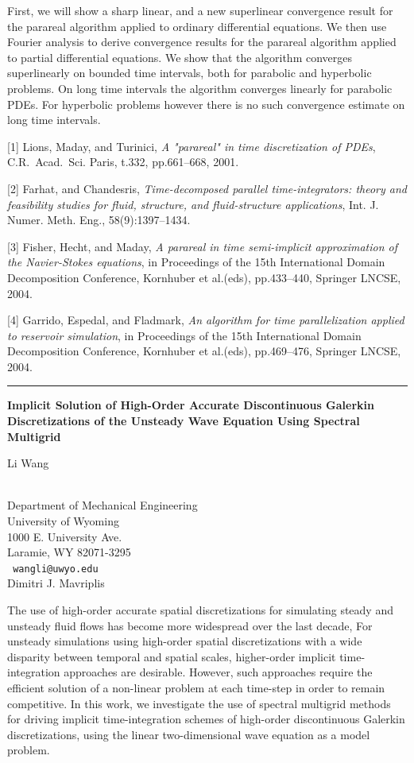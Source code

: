 \documentclass[twosided]{report}
\begin{document}
First, we will show a sharp linear, and a new superlinear convergence
result for the parareal algorithm applied to ordinary differential
equations. We then use Fourier analysis to derive convergence results
for the parareal algorithm applied to partial differential equations.
We show that the algorithm converges superlinearly on bounded time
intervals, both for parabolic and hyperbolic problems. On long time
intervals the algorithm converges linearly for parabolic PDEs. For
hyperbolic problems however there is no such convergence estimate on
long time intervals.

[1] Lions, Maday, and Turinici,
{\em A "parareal" in time discretization of
PDEs}, C.R.~Acad.~Sci. Paris, t.332, pp.661--668, 2001.

[2] Farhat, and Chandesris,
{\em Time-decomposed parallel time-integrators:
theory and feasibility studies for fluid, structure, and
fluid-structure applications}, Int. J. Numer. Meth. Eng.,
58(9):1397--1434.

[3] Fisher, Hecht, and Maday,
{\em A parareal in time semi-implicit
approximation of the Navier-Stokes equations}, in Proceedings of the
15th International Domain Decomposition Conference, Kornhuber et
al.(eds), pp.433--440, Springer LNCSE, 2004.

[4] Garrido, Espedal, and Fladmark,
{\em An algorithm for time
parallelization applied to reservoir simulation}, in Proceedings of the
15th International Domain Decomposition Conference, Kornhuber et
al.(eds), pp.469--476, Springer LNCSE, 2004.

\begin{center}

\rule{6in}{1pt}
\end{center}

\begin{center}
{\large			\label{wang}
{\bf
Implicit Solution of High-Order Accurate Discontinuous Galerkin
Discretizations of the Unsteady Wave Equation Using Spectral Multigrid
}

Li Wang} \\ 
Department of Mechanical Engineering \\
University of Wyoming \\
1000 E. University Ave. \\
Laramie, WY 82071-3295
\\ {\tt
wangli@uwyo.edu
}
\\
Dimitri J. Mavriplis
\end{center}

The use of high-order accurate spatial discretizations for simulating
steady and unsteady fluid flows has become more widespread over the
last decade, For unsteady simulations using high-order spatial
discretizations with a wide disparity between temporal and spatial
scales, higher-order implicit time-integration approaches are
desirable. However, such approaches require the efficient solution of a
non-linear problem at each time-step in order to remain competitive. In
this work, we investigate the use of spectral multigrid methods for
driving implicit time-integration schemes of high-order discontinuous
Galerkin discretizations, using the linear two-dimensional wave
equation as a model problem.
\end{document}
